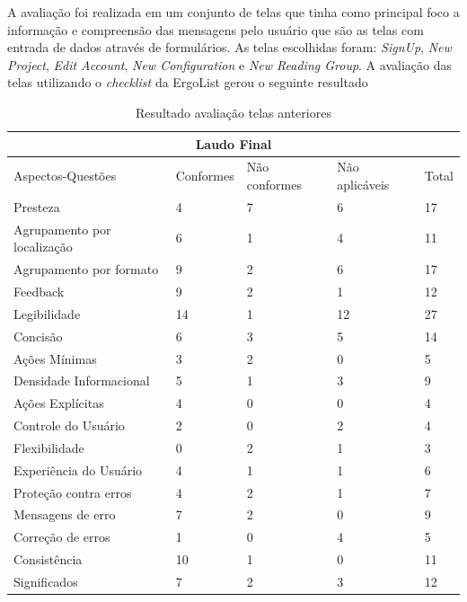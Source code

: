 A avaliação foi realizada em um conjunto de telas que tinha como principal foco a informação e compreensão das mensagens pelo usuário que são as telas com entrada de dados através de formulários. As telas escolhidas foram: \textit{SignUp}, \textit{New Project}, \textit{Edit Account}, \textit{New Configuration} e \textit{New Reading Group}. A avaliação das telas utilizando o \textit{checklist} da ErgoList gerou o seguinte resultado

\begin{table}[h]
\begin{tabular}{|l|l|l|l|l|}
\hline
\multicolumn{5}{c}{\textbf{Laudo Final}}                                         \\ \hline
Aspectos-Questões           & Conformes & Não conformes & Não aplicáveis & Total \\ \hline
Presteza                    & 4         & 7             & 6              & 17    \\ \hline
Agrupamento por localização & 6         & 1             & 4              & 11    \\ \hline
Agrupamento por formato     & 9         & 2             & 6              & 17    \\ \hline
Feedback                    & 9         & 2             & 1              & 12    \\ \hline
Legibilidade                & 14        & 1             & 12             & 27    \\ \hline
Concisão                    & 6         & 3             & 5              & 14    \\ \hline
Ações Mínimas               & 3         & 2             & 0              & 5     \\ \hline
Densidade Informacional     & 5         & 1             & 3              & 9     \\ \hline
Ações Explícitas            & 4         & 0             & 0              & 4     \\ \hline
Controle do Usuário         & 2         & 0             & 2              & 4     \\ \hline
Flexibilidade               & 0         & 2             & 1              & 3     \\ \hline
Experiência do Usuário      & 4         & 1             & 1              & 6     \\ \hline
Proteção contra erros       & 4         & 2             & 1              & 7     \\ \hline
Mensagens de erro           & 7         & 2             & 0              & 9     \\ \hline
Correção de erros           & 1         & 0             & 4              & 5     \\ \hline
Consistência                & 10        & 1             & 0              & 11    \\ \hline
Significados                & 7         & 2             & 3              & 12    \\ \hline
\end{tabular}
\caption{Resultado avaliação telas anteriores}
\end{table}

